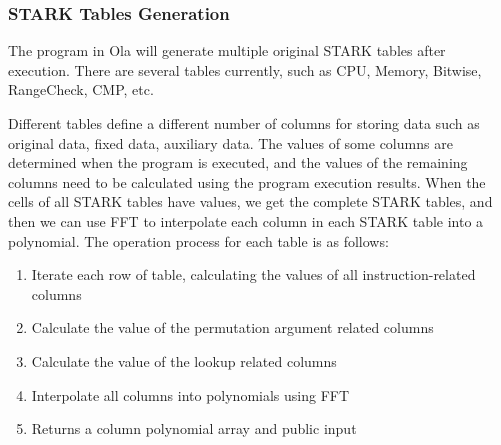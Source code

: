 \subsubsection{STARK Tables Generation}\label{section: starky-generation-tables}

The program in Ola will generate multiple original STARK tables after execution. There are several tables currently, such as CPU, Memory, Bitwise, RangeCheck, CMP, etc.

Different tables define a different number of columns for storing data such as original data, fixed data, auxiliary data. The values of some columns are determined when the program is executed, and the values of the remaining columns need to be calculated using the program execution results. When the cells of all STARK tables have values, we get the complete STARK tables, and then we can use FFT to interpolate each column in each STARK table into a polynomial. The operation process for each table is as follows:

\begin{enumerate}
    \item Iterate each row of table, calculating the values of all instruction-related columns
    \item Calculate the value of the permutation argument related columns
    \item Calculate the value of the lookup related columns
    \item Interpolate all columns into polynomials using FFT
    \item Returns a column polynomial array and public input
\end{enumerate}
